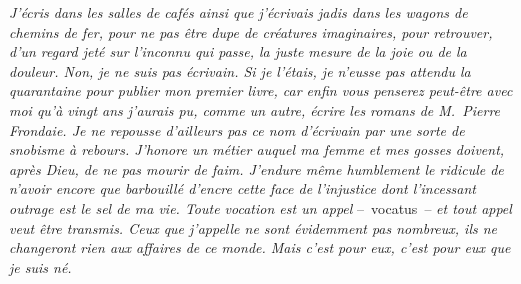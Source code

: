 \documentclass[french,twoside]{book} %
\newcommand{\astertri}{\medskip\par\centerline{\color{rubric}\large\selectfont{\syms ✻\,✻\,✻}}\medskip\par}%
\begin{document}
\emph{J’écris dans les salles de cafés ainsi que j’écrivais jadis dans les wagons de chemins de fer, pour ne pas être dupe de créatures imaginaires, pour retrouver, d’un regard jeté sur l’inconnu qui passe, la juste mesure de la joie ou de la douleur. Non, je ne suis pas écrivain. Si je l’étais, je n’eusse pas attendu la quarantaine pour publier mon premier livre, car enfin vous penserez peut-être avec moi qu’à vingt ans j’aurais pu, comme un autre, écrire les romans de M. Pierre Frondaie. Je ne repousse d’ailleurs pas ce nom d’écrivain par une sorte de snobisme à rebours. J’honore un métier auquel ma femme et mes gosses doivent, après Dieu, de ne pas mourir de faim. J’endure même humblement le ridicule de n’avoir encore que barbouillé d’encre cette face de l’injustice dont l’incessant outrage est le sel de ma vie. Toute vocation est un appel} – vocatus – \emph{et tout appel veut être transmis. Ceux que j’appelle ne sont évidemment pas nombreux, ils ne changeront rien aux affaires de ce monde. Mais c’est pour eux, c’est pour eux que je suis né.}\par

\astertri
\end{document}
